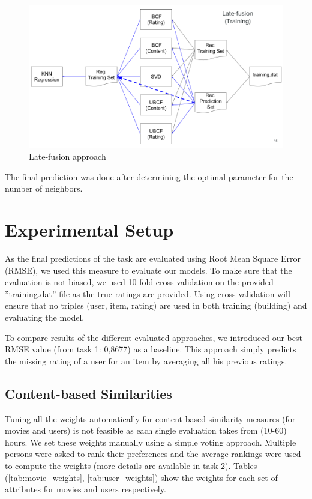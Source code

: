 \documentclass{sigish}
\begin{document}
\begin{figure}
	\centering
	\includegraphics[width=\columnwidth]{images/late_fusion_approach.png}
	\caption{Late-fusion approach}
	\label{fig:late_fusion_approach}
\end{figure}

The final prediction was done after determining the optimal parameter for the number of neighbors.

\section{Experimental Setup}

As the final predictions of the task are evaluated using Root Mean Square Error (RMSE), we used this measure to evaluate our models. To make sure that the evaluation is not biased, we used 10-fold cross validation on the provided ''training.dat'' file as the true ratings are provided. Using cross-validation will ensure that no triples (user, item, rating) are used in both training (building) and evaluating the model.

To compare results of the different evaluated approaches, we introduced our best RMSE value (from task 1: 0,8677) as a baseline. This approach simply predicts the missing rating of a user for an item by averaging all his previous ratings.

\subsection{Content-based Similarities}
Tuning all the weights automatically for content-based similarity measures (for movies and users) is not feasible as each single evaluation takes from (10-60) hours. We set these weights manually using a simple voting approach. Multiple persons were asked to rank their preferences and the average rankings were used to compute the weights (more details are available in task 2). Tables (\ref{tab:movie_weights}, \ref{tab:user_weights}) show the weights for each set of attributes for movies and users respectively.
\end{document}
